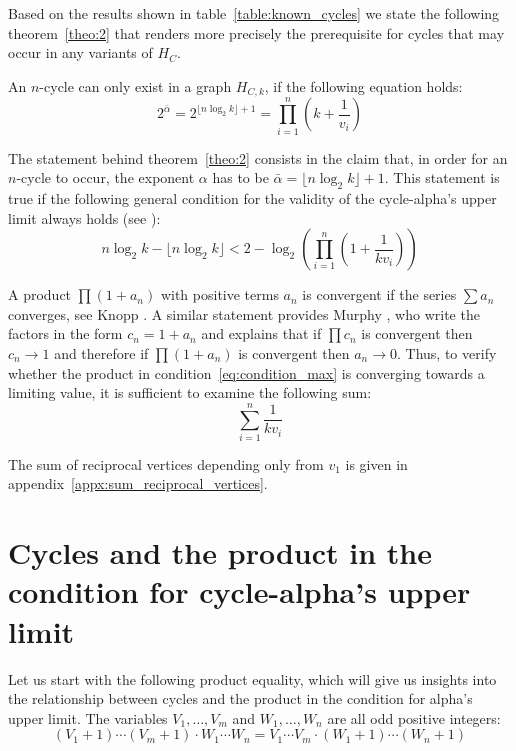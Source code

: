 Based on the results shown in table~\ref{table:known_cycles} we state the following theorem~\ref{theo:2} that renders more precisely the prerequisite for cycles that may occur in any variants of $H_C$.

\begin{theorem}
	\label{theo:2}
	An $n$-cycle can only exist in a graph $H_{C,k}$, if the following equation holds:
	\begin{equation*}
	2^{\bar\alpha}=2^{\lfloor n\log_2k\rfloor+1}=\prod_{i=1}^{n}\left(k+\frac{1}{v_i}\right)
	\end{equation*}
\end{theorem}

The statement behind theorem~\ref{theo:2} consists in the claim that, in order for an $n$-cycle to occur, the exponent $\alpha$ has to be $\bar\alpha=\lfloor n\log_2k\rfloor+1$. This statement is true if the following general condition for the validity of the cycle-alpha's upper limit always holds (see \cite{Ref_Koch_2020}):
\begin{equation}
\label{eq:condition_max}
n\log_2k-\lfloor n\log_2k\rfloor<2-\log_2\left(\prod_{i=1}^{n}\left(1+\frac{1}{kv_{i}}\right)\right)
\end{equation}

A product $\prod(1+a_n)$ with positive terms $a_n$ is convergent if the series $\sum a_n$ converges, see Knopp \cite[p.~220]{Ref_Knopp}. A similar statement provides Murphy \cite{Ref_Murphy}, who write the factors in the form $c_n=1+a_n$ and explains that if $\prod c_n$ is convergent then $c_n\rightarrow1$ and therefore if $\prod (1+a_n)$ is convergent then $a_n\rightarrow0$. Thus, to verify whether the product in condition~\ref{eq:condition_max} is converging towards a limiting value, it is sufficient to examine the following sum:
\begin{equation*}
\sum_{i=1}^{n}\frac{1}{kv_{i}}
\end{equation*}

The sum of reciprocal vertices depending only from $v_1$ is given in appendix~\ref{appx:sum_reciprocal_vertices}.

\section{Cycles and the product in the condition for cycle-alpha's upper limit}
Let us start with the following product equality, which will give us insights into the relationship between cycles and the product in the condition for alpha's upper limit. The variables $V_1,\ldots,V_m$ and $W_1,\ldots,W_n$ are all odd positive integers:
\begin{equation}
	\label{eq:product_equality}
	(V_1+1)\cdots(V_m+1)\cdot W_1\cdots W_n=V_1\cdots V_m\cdot(W_1+1)\cdots(W_n+1)
\end{equation}

